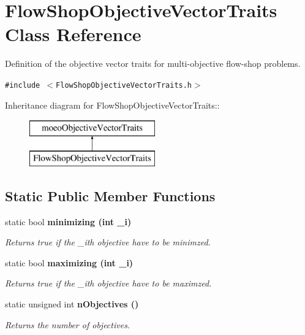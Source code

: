 \section{Flow\-Shop\-Objective\-Vector\-Traits Class Reference}
\label{classFlowShopObjectiveVectorTraits}
Definition of the objective vector traits for multi-objective flow-shop problems.  


{\tt \#include $<$Flow\-Shop\-Objective\-Vector\-Traits.h$>$}

Inheritance diagram for Flow\-Shop\-Objective\-Vector\-Traits::\begin{figure}[H]
\begin{center}
\leavevmode
\includegraphics[height=2cm]{classFlowShopObjectiveVectorTraits}
\end{center}
\end{figure}
\subsection*{Static Public Member Functions}
\begin{CompactItemize}
\item 
static bool \bf{minimizing} (int \_\-i)
\begin{CompactList}\small\item\em Returns true if the \_\-ith objective have to be minimzed. \item\end{CompactList}\item 
static bool \bf{maximizing} (int \_\-i)
\begin{CompactList}\small\item\em Returns true if the \_\-ith objective have to be maximzed. \item\end{CompactList}\item 
static unsigned int \bf{n\-Objectives} ()\label{classFlowShopObjectiveVectorTraits_76ebe7639b502980bc683ab404b69c10}

\begin{CompactList}\small\item\em Returns the number of objectives. \item\end{CompactList}\end{CompactItemize}


